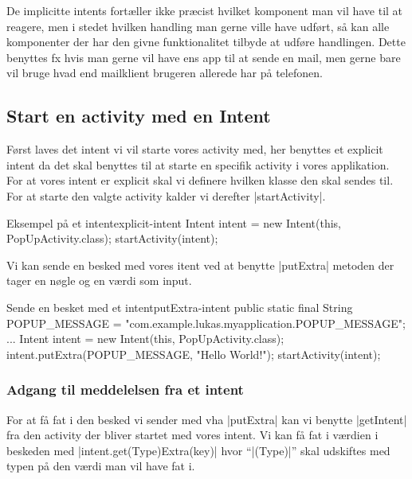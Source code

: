 De implicitte intents fortæller ikke præcist hvilket komponent man vil have til at reagere, men i stedet hvilken handling man gerne ville have udført, så kan alle komponenter der har den givne funktionalitet tilbyde at udføre handlingen. Dette benyttes fx hvis man gerne vil have ens app til at sende en mail, men gerne bare vil bruge hvad end mailklient brugeren allerede har på telefonen.

\subsection{Start en activity med en Intent}

Først laves det intent vi vil starte vores activity med, her benyttes et explicit intent da det skal benyttes til at starte en specifik activity i vores applikation. For at vores intent er explicit skal vi definere hvilken klasse den skal sendes til. For at starte den valgte activity kalder vi derefter \JavaInline|startActivity|.

\begin{example}\noindent
	\begin{JavaCode}{Eksempel på et intent}{explicit-intent}
		Intent intent = new Intent(this, PopUpActivity.class);
		startActivity(intent);
	\end{JavaCode}
\end{example}

Vi kan sende en besked med vores itent ved at benytte \JavaInline|putExtra| metoden der tager en nøgle og en værdi som input.

\begin{example}\noindent
	\begin{JavaCode}{Sende en besket med et intent}{putExtra-intent}
		public static final String POPUP_MESSAGE = "com.example.lukas.myapplication.POPUP_MESSAGE";
		...
		Intent intent = new Intent(this, PopUpActivity.class);
		intent.putExtra(POPUP_MESSAGE, "Hello World!");
		startActivity(intent);
	\end{JavaCode}
\end{example}

\subsubsection{Adgang til meddelelsen fra et intent}

For at få fat i den besked vi sender med vha \JavaInline|putExtra| kan vi benytte \JavaInline|getIntent| fra den activity der bliver startet med vores intent. Vi kan få fat i værdien i beskeden med \JavaInline|intent.get(Type)Extra(key)|  hvor ``\JavaInline|(Type)|'' skal udskiftes med typen på den værdi man vil have fat i.

